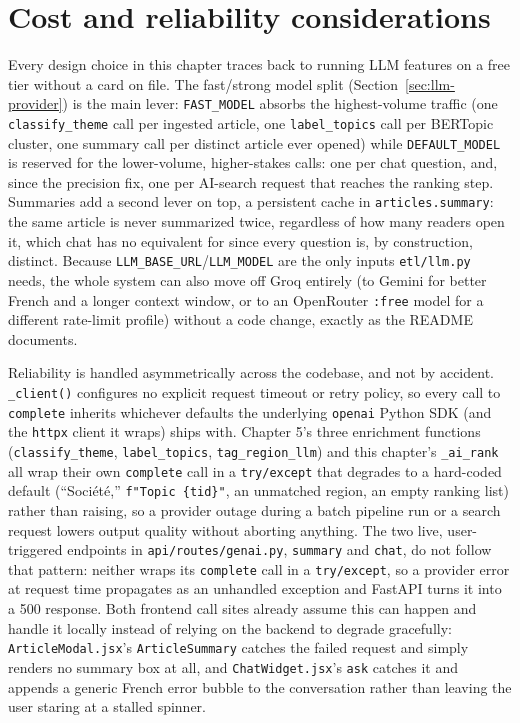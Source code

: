 \section{Cost and reliability considerations}
\label{sec:genai-cost}
\begin{sloppypar}
Every design choice in this chapter traces back to running LLM features on a free tier without a card on file. The fast/strong model split (Section~\ref{sec:llm-provider}) is the main lever: \texttt{FAST\_MODEL} absorbs the highest-volume traffic (one \texttt{classify\_theme} call per ingested article, one \texttt{label\_topics} call per BERTopic cluster, one summary call per distinct article ever opened) while \texttt{DEFAULT\_MODEL} is reserved for the lower-volume, higher-stakes calls: one per chat question, and, since the precision fix, one per AI-search request that reaches the ranking step. Summaries add a second lever on top, a persistent cache in \texttt{articles.summary}: the same article is never summarized twice, regardless of how many readers open it, which chat has no equivalent for since every question is, by construction, distinct. Because \texttt{LLM\_BASE\_URL}/\texttt{LLM\_MODEL} are the only inputs \texttt{etl/llm.py} needs, the whole system can also move off Groq entirely (to Gemini for better French and a longer context window, or to an OpenRouter \texttt{:free} model for a different rate-limit profile) without a code change, exactly as the README documents.
\end{sloppypar}

\begin{sloppypar}
Reliability is handled asymmetrically across the codebase, and not by accident. \texttt{\_client()} configures no explicit request timeout or retry policy, so every call to \texttt{complete} inherits whichever defaults the underlying \texttt{openai} Python SDK (and the \texttt{httpx} client it wraps) ships with. Chapter 5's three enrichment functions (\texttt{classify\_theme}, \texttt{label\_topics}, \texttt{tag\_region\_llm}) and this chapter's \texttt{\_ai\_rank} all wrap their own \texttt{complete} call in a \texttt{try/except} that degrades to a hard-coded default (``Société,'' \texttt{f"Topic \{tid\}"}, an unmatched region, an empty ranking list) rather than raising, so a provider outage during a batch pipeline run or a search request lowers output quality without aborting anything. The two live, user-triggered endpoints in \texttt{api/\allowbreak routes/\allowbreak genai.py}, \texttt{summary} and \texttt{chat}, do not follow that pattern: neither wraps its \texttt{complete} call in a \texttt{try/except}, so a provider error at request time propagates as an unhandled exception and FastAPI turns it into a 500 response. Both frontend call sites already assume this can happen and handle it locally instead of relying on the backend to degrade gracefully: \texttt{ArticleModal.jsx}'s \texttt{ArticleSummary} catches the failed request and simply renders no summary box at all, and \texttt{ChatWidget.jsx}'s \texttt{ask} catches it and appends a generic French error bubble to the conversation rather than leaving the user staring at a stalled spinner.
\end{sloppypar}


